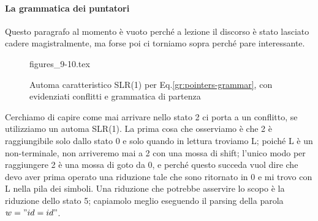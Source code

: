 \documentclass[class=book, crop=false, oneside, 12pt]{standalone}
\begin{document}
\paragraph{La grammatica dei puntatori}
Questo paragrafo al momento è vuoto perché a lezione il discorso è stato lasciato cadere magistralmente, ma forse poi ci torniamo sopra perché pare interessante.



\begin{figure}[H]
    \centering
	{figures_9-10.tex}
    \caption{Automa caratteristico SLR(1) per Eq.\ref{gr:pointers-grammar}, con evidenziati conflitti e grammatica di partenza}
    \label{fig:pointers-automaton-slr1-conflict}
\end{figure}
Cerchiamo di capire come mai arrivare nello stato 2 ci porta a un conflitto, se utilizziamo un automa SLR(1). La prima cosa che osserviamo è che 2 è raggiungibile solo dallo stato 0 e solo quando in lettura troviamo L; poiché L è un non-terminale, non arriveremo mai a 2 con una mossa di shift; l'unico modo per  raggiungere 2 è una mossa di goto da 0, e perché questo succeda vuol dire che devo aver prima operato una riduzione tale che sono ritornato in 0 e mi trovo con L nella pila dei simboli. Una riduzione che potrebbe asservire lo scopo è la riduzione dello stato 5; capiamolo meglio eseguendo il parsing della parola \(w = "id=id"\).
\end{document}
